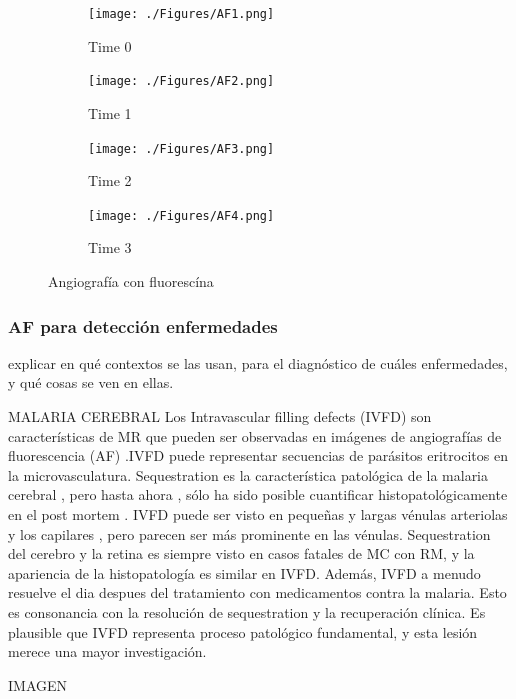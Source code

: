 \begin{figure}[H]
	\centering
	\begin{subfigure}[b]{0.23\textwidth}
        \texttt{[image: ./Figures/AF1.png]}
        \caption{Time 0}
        \label{fig:af1}
    \end{subfigure}
	\begin{subfigure}[b]{0.23\textwidth}
        \texttt{[image: ./Figures/AF2.png]}
        \caption{Time 1}
        \label{fig:af2}
    \end{subfigure}
	\begin{subfigure}[b]{0.23\textwidth}
        \texttt{[image: ./Figures/AF3.png]}
        \caption{Time 2}
        \label{fig:af3}
    \end{subfigure}
    	\begin{subfigure}[b]{0.23\textwidth}
        \texttt{[image: ./Figures/AF4.png]}
        \caption{Time 3}
        \label{fig:af4}
    \end{subfigure}
	\label{fig:retina}
	\caption{Angiograf\'ia con fluoresc\'ina}
\end{figure}


\subsubsection{AF para detecci\'on enfermedades }

explicar en qué contextos se las usan, para el diagnóstico de cuáles enfermedades, y qué cosas se ven en ellas.

MALARIA CEREBRAL
Los Intravascular filling defects (IVFD) son características de  MR que pueden ser observadas en imágenes de  angiografías de fluorescencia (AF) .IVFD puede representar secuencias de parásitos eritrocitos en la microvasculatura. Sequestration es la característica patológica de la malaria cerebral , pero hasta ahora , sólo ha sido posible cuantificar histopatológicamente en el post mortem . IVFD puede ser visto en pequeñas y largas vénulas arteriolas y los capilares , pero parecen ser más prominente en las vénulas. Sequestration del cerebro y la retina es siempre visto en casos fatales de MC con RM, y la apariencia de la histopatología es similar en IVFD. Además, IVFD a menudo resuelve el dia despues del tratamiento con medicamentos contra la malaria. Esto es consonancia con  la resolución de sequestration y la recuperación clínica. Es plausible que  IVFD representa proceso patológico fundamental, y esta lesión merece una mayor investigación. \cite{zhao2015automated}

IMAGEN

